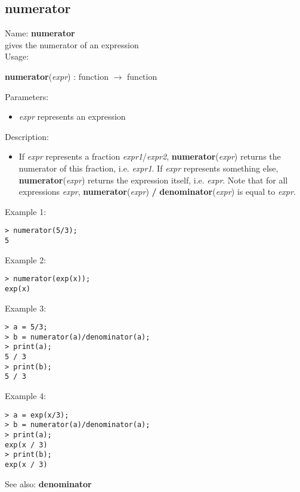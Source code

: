\subsection{ numerator }
\noindent Name: \textbf{numerator}\\
gives the numerator of an expression\\

\noindent Usage: 
\begin{center}
\textbf{numerator}(\emph{expr}) : \textsf{function} $\rightarrow$ \textsf{function}\\
\end{center}
Parameters: 
\begin{itemize}
\item \emph{expr} represents an expression
\end{itemize}
\noindent Description: \begin{itemize}

\item If \emph{expr} represents a fraction \emph{expr1}/\emph{expr2}, \textbf{numerator}(\emph{expr})
   returns the numerator of this fraction, i.e. \emph{expr1}.
   If \emph{expr} represents something else, \textbf{numerator}(\emph{expr}) 
   returns the expression itself, i.e. \emph{expr}.
   Note that for all expressions \emph{expr}, \textbf{numerator}(\emph{expr}) \textbf{/} \textbf{denominator}(\emph{expr})
   is equal to \emph{expr}.
\end{itemize}
\noindent Example 1: 
\begin{center}\begin{minipage}{15cm}\begin{Verbatim}[frame=single]
> numerator(5/3);
5
\end{Verbatim}
\end{minipage}\end{center}
\noindent Example 2: 
\begin{center}\begin{minipage}{15cm}\begin{Verbatim}[frame=single]
> numerator(exp(x));
exp(x)
\end{Verbatim}
\end{minipage}\end{center}
\noindent Example 3: 
\begin{center}\begin{minipage}{15cm}\begin{Verbatim}[frame=single]
> a = 5/3;
> b = numerator(a)/denominator(a);
> print(a);
5 / 3
> print(b);
5 / 3
\end{Verbatim}
\end{minipage}\end{center}
\noindent Example 4: 
\begin{center}\begin{minipage}{15cm}\begin{Verbatim}[frame=single]
> a = exp(x/3);
> b = numerator(a)/denominator(a);
> print(a);
exp(x / 3)
> print(b);
exp(x / 3)
\end{Verbatim}
\end{minipage}\end{center}
See also: \textbf{denominator}
